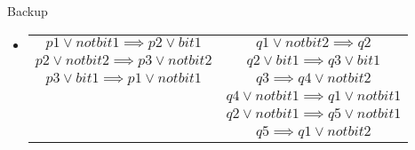 \documentclass{beamer}
\begin{document}

\begin{frame}{Backup}
  \begin{itemize}
    \item{ \begin{center}
    \begin{tabular}{c c}
      {$p1 \vee notbit1 \implies p2 \vee bit1$} & {$q1 \vee notbit2 \implies q2$}\\
     $p2 \vee notbit2 \implies p3 \vee notbit2$ & {$q2 \vee bit1 \implies q3 \vee bit1$}\\
      $p3 \vee bit1 \implies p1 \vee notbit1$  & {$q3 \implies q4 \vee notbit2$}\\
      {} & {$q4\vee notbit1 \implies q1 \vee notbit1$} \\
      {} &{$q2 \vee notbit1 \implies q5\vee notbit1$} \\
      {} &{$q5 \implies q1 \vee notbit2$}
    \end{tabular} 
  \end{center}}
\end{itemize}
\end{frame}


    
    

 
    

\end{document}
